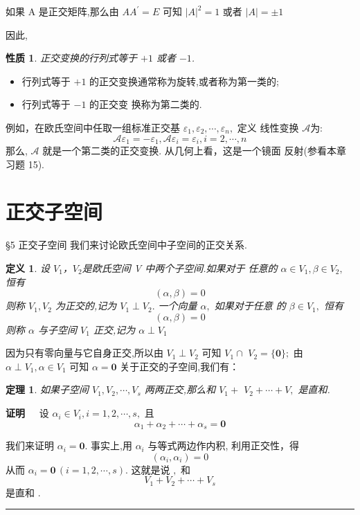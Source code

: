 \documentclass[13pt]{beamer}
\newtheorem{thm}{定理}
\newtheorem*{defi}{定义}
\newtheorem*{prop}{性质}
\def\qed{\nopagebreak\hfill{\rule{4pt}{7pt}}\medbreak}
\def\pf{{\bf 证明~~ }}
\begin{document}
\begin{frame}
如果 A 是正交矩阵,那么由
$
{A A}^{\prime}={E}
$
可知
$
|{A}|^{2}=1 \text { 或者 }|{A}|=\pm 1
$

因此,
\begin{prop}
正交变换的行列式等于 $+ 1$ 或者 $- 1$.
\end{prop}

\begin{itemize}
\item 行列式等于 $+1$ 的正交变换通常称为旋转,或者称为\alert{第一类}的;
\item 行列式等于 $- 1$ 的正交变 换称为\alert{第二类}的.  
\end{itemize}



例如，在欧氏空间中任取一组标准正交基 ${\varepsilon}_{1}, {\varepsilon}_{2}, \cdots, {\varepsilon}_{n},$ 定义
线性变换 $\mathscr{A}$为:
\[
\mathscr{A} {\varepsilon}_{1}=-{\varepsilon}_{1}, \mathscr{A} {\varepsilon}_{i}={\varepsilon}_{i}, i=2, \cdots, {n}
\]
那么, $\mathscr{A}$ 就是一个第二类的正交变换. 从几何上看，这是一个镜面 反射(参看本章习题 15). 
\end{frame}




\section{正交子空间}
\begin{frame}{\S 5 正交子空间}
我们来讨论欧氏空间中子空间的正交关系. 
\begin{defi}
设 $V_1$，$V_2$是欧氏空间 V 中两个子空间.如果对于 任意的 ${\alpha} \in V_{1}, {\beta} \in V_{2},$ 恒有
\[
({\alpha}, {\beta})= {0}
\]
则称 $V_{1}, V_{2}$ 为正交的,记为 $V_{1} \perp V_{2} .$ 一个向量 ${\alpha},$ 如果对于任意 的 ${\beta} \in V_{1},$ 恒有
\[
({\alpha}, {\beta})=0
\]
则称 ${\alpha}$ 与子空间 $V_{1}$ \alert{正交},记为 ${\alpha} \perp V_{1}$
\end{defi}
\end{frame}


\begin{frame}
因为只有零向量与它自身正交,所以由 $V_{1} \perp V_{2}$ 可知 $V_{1} \cap$ $V_{2}=\{\mathbf{0}\} ;$ 由 ${\alpha} \perp V_{1}, {\alpha} \in V_{1}$ 可知 ${\alpha}=\mathbf{0}$
关于正交的子空间,我们有： 
\begin{thm}
	如果子空间 $V_{1}, V_{2}, \cdots, V_{s}$ 两两正交,那么和 $V_{1}+$ $V_{2}+\cdots+V,$ 是直和. 
\end{thm}
\pf 设 ${\alpha}_{i} \in V_{i}, i=1,2, \cdots, s,$ 且
\[
{\alpha}_{1}+{\alpha}_{2}+\cdots+{\alpha}_{s}=\mathbf{0}
\]
 
我们来证明 ${\alpha}_{i}=\mathbf{0}$.  事实上,用 ${\alpha}_{i}$ 与等式两边作内积, 利用正交性，得
\[
\left({\alpha}_{i}, {\alpha}_{i}\right)=0
\]
从而 ${\alpha}_{i}=\mathbf{0}\, (i=1,2, \cdots, s) .$ 这就是说 $,$ 和
\[
V_{1}+V_{2}+\cdots+V_{s}
\]
是直和 . \qed
\end{frame}
\end{document}
